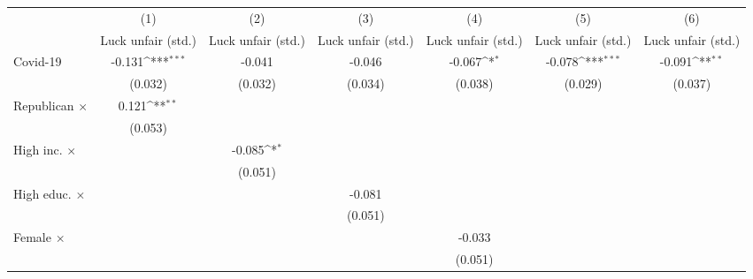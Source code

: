 {
\def\sym#1{\ifmmode^{#1}\else\(^{#1}\)\fi}
\begin{tabular}{l*{6}{c}}
\toprule
                    &\multicolumn{1}{c}{(1)}&\multicolumn{1}{c}{(2)}&\multicolumn{1}{c}{(3)}&\multicolumn{1}{c}{(4)}&\multicolumn{1}{c}{(5)}&\multicolumn{1}{c}{(6)}\\
                    &\multicolumn{1}{c}{Luck unfair (std.)}&\multicolumn{1}{c}{Luck unfair (std.)}&\multicolumn{1}{c}{Luck unfair (std.)}&\multicolumn{1}{c}{Luck unfair (std.)}&\multicolumn{1}{c}{Luck unfair (std.)}&\multicolumn{1}{c}{Luck unfair (std.)}\\
\midrule
Covid-19            &      -0.131\sym{***}&      -0.041         &      -0.046         &      -0.067\sym{*}  &      -0.078\sym{***}&      -0.091\sym{**} \\
                    &     (0.032)         &     (0.032)         &     (0.034)         &     (0.038)         &     (0.029)         &     (0.037)         \\
\addlinespace
Republican $\times$ &       0.121\sym{**} &                     &                     &                     &                     &                     \\
                    &     (0.053)         &                     &                     &                     &                     &                     \\
\addlinespace
High inc. $\times$  &                     &      -0.085\sym{*}  &                     &                     &                     &                     \\
                    &                     &     (0.051)         &                     &                     &                     &                     \\
\addlinespace
High educ. $\times$ &                     &                     &      -0.081         &                     &                     &                     \\
                    &                     &                     &     (0.051)         &                     &                     &                     \\
\addlinespace
Female $\times$     &                     &                     &                     &      -0.033         &                     &                     \\
                    &                     &                     &                     &     (0.051)         &                     &                     \\

\end{tabular}}
